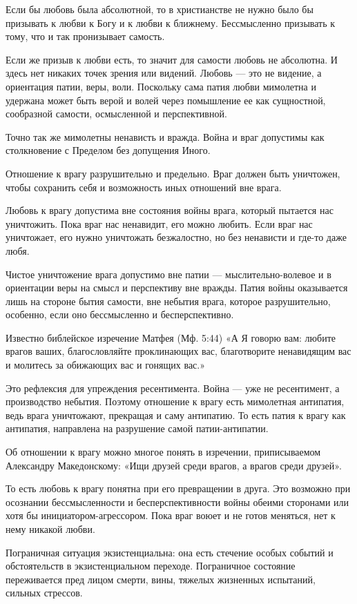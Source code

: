 Если бы любовь была абсолютной, то в христианстве не нужно было бы призывать к
любви к Богу и к любви к ближнему. Бессмысленно призывать к тому, что и так
пронизывает самость.

Если же призыв к любви есть, то значит для самости любовь не абсолютна. И здесь нет никаких точек зрения или видений. Любовь — это не видение, а ориентация патии, веры, воли. Поскольку сама патия любви мимолетна и удержана может быть верой и волей через помышление ее как сущностной, сообразной самости, осмысленной и перспективной.

Точно так же мимолетны ненависть и вражда. Война и враг допустимы как столкновение с Пределом без допущения Иного.

Отношение к врагу разрушительно и предельно. Враг должен быть уничтожен, чтобы
сохранить себя и возможность иных отношений вне врага.

Любовь к врагу допустима вне состояния войны врага, который пытается нас
уничтожить. Пока враг нас ненавидит, его можно любить. Если враг нас
уничтожает, его нужно уничтожать безжалостно, но без ненависти и где-то даже
любя.

Чистое уничтожение врага допустимо вне патии — мыслительно-волевое и в
ориентации веры на смысл и перспективу вне вражды. Патия войны оказывается лишь
на стороне бытия самости, вне небытия врага, которое разрушительно, особенно,
если оно бессмысленно и бесперспективно.

Известно библейское изречение Матфея (Мф. 5:44) «А Я говорю вам: любите врагов
ваших, благословляйте проклинающих вас, благотворите ненавидящим вас и молитесь
за обижающих вас и гонящих вас.»

Это рефлексия для упреждения ресентимента. Война — уже не ресентимент, а
производство небытия. Поэтому отношение к врагу есть мимолетная антипатия, ведь
врага уничтожают, прекращая и саму антипатию. То есть патия к врагу как
антипатия, направлена на разрушение самой патии-антипатии.

Об отношении к врагу можно многое понять в изречении, приписываемом Александру
Македонскому: «Ищи друзей среди врагов, а врагов среди друзей».

То есть любовь к врагу понятна при его превращении в друга. Это возможно при
осознании бессмысленности и бесперспективности войны обеими сторонами или хотя
бы инициатором-агрессором. Пока враг воюет и не готов меняться, нет к нему
никакой любви.

Пограничная ситуация экзистенциальна: она есть стечение особых событий и
обстоятельств в экзистенциальном переходе. Пограничное состояние переживается
пред лицом смерти, вины, тяжелых жизненных испытаний, сильных стрессов.

